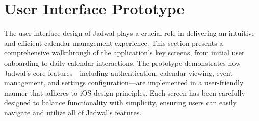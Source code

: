 \section{User Interface Prototype}

The user interface design of Jadwal plays a crucial role in delivering an intuitive and efficient calendar management experience. This section presents a comprehensive walkthrough of the application's key screens, from initial user onboarding to daily calendar interactions. The prototype demonstrates how Jadwal's core features—including authentication, calendar viewing, event management, and settings configuration—are implemented in a user-friendly manner that adheres to iOS design principles. Each screen has been carefully designed to balance functionality with simplicity, ensuring users can easily navigate and utilize all of Jadwal's features.

\vskip 2cm

